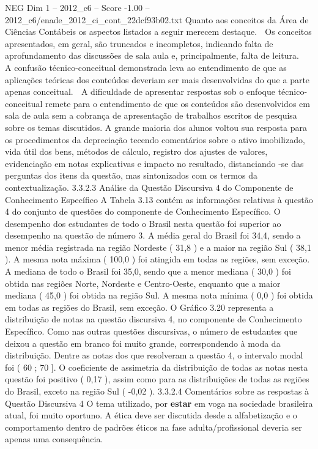 \begin{textsample}{NEG Dim 1 – 2012\_c6 – Score -1.00 – 2012\_c6/enade\_2012\_ci\_cont\_22dcf93b02.txt}
Quanto aos conceitos da Área de Ciências Contábeis os aspectos listados a seguir merecem destaque.  Os conceitos apresentados, em geral, são truncados e incompletos, indicando falta de aprofundamento das discussões de sala aula e, principalmente, falta de leitura.  A confusão técnico-conceitual demonstrada leva ao entendimento de que as aplicações teóricas dos conteúdos deveriam ser mais desenvolvidas do que a parte apenas conceitual.  A dificuldade de apresentar respostas sob o enfoque técnico-conceitual remete para o entendimento de que os conteúdos são desenvolvidos em sala de aula sem a cobrança de apresentação de trabalhos escritos de pesquisa sobre os temas discutidos.
A grande maioria dos alunos voltou sua resposta para os procedimentos da depreciação tecendo comentários sobre o ativo imobilizado, vida útil dos bens, métodos de cálculo, registro dos ajustes de valores, evidenciação em notas explicativas e impacto no resultado, distanciando -se das perguntas dos itens da questão, mas sintonizados com os termos da contextualização. 3.3.2.3 Análise da Questão Discursiva 4 do Componente de Conhecimento Específico A Tabela 3.13 contém as informações relativas à questão 4 do conjunto de questões do componente de Conhecimento Específico.
O desempenho dos estudantes de todo o Brasil nesta questão foi superior ao desempenho na questão de número 3.
A média geral do Brasil foi 34,4, sendo a menor média registrada na região Nordeste ( 31,8 ) e a maior na região Sul ( 38,1 ).
A mesma nota máxima ( 100,0 ) foi atingida em todas as regiões, sem exceção.
A mediana de todo o Brasil foi 35,0, sendo que a menor mediana ( 30,0 ) foi obtida nas regiões Norte, Nordeste e Centro-Oeste, enquanto que a maior mediana ( 45,0 ) foi obtida na região Sul.
A mesma nota mínima ( 0,0 ) foi obtida em todas as regiões do Brasil, sem exceção.
O Gráfico 3.20 representa a distribuição de notas na questão discursiva 4, no componente de Conhecimento Específico.
Como nas outras questões discursivas, o número de estudantes que deixou a questão em branco foi muito grande, correspondendo à moda da distribuição.
Dentre as notas dos que resolveram a questão 4, o intervalo modal foi ( 60 ; 70 ].
O coeficiente de assimetria da distribuição de todas as notas nesta questão foi positivo ( 0,17 ), assim como para as distribuições de todas as regiões do Brasil, exceto na região Sul ( -0,02 ). 3.3.2.4 Comentários sobre as respostas à Questão Discursiva 4 O tema utilizado, por \textbf{estar} em voga na sociedade brasileira atual, foi muito oportuno.
A ética deve ser discutida desde a alfabetização e o comportamento dentro de padrões éticos na fase adulta/profissional deveria ser apenas uma consequência.

\end{textsample}
